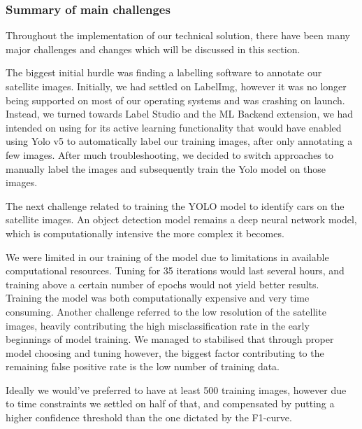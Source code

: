 \subsubsection{Summary of main challenges}
Throughout the implementation of our technical solution, there have been many
major challenges and changes which will be discussed in this section.


The biggest initial hurdle was finding a labelling software to annotate our
satellite images. Initially, we had settled on LabelImg, however it was no
longer being supported on most of our operating systems and was crashing on
launch. Instead, we turned towards Label Studio and the ML Backend extension, we
had intended on using for its active learning functionality that would have
enabled using Yolo v5 to automatically label our training images, after only
annotating a few images. After much troubleshooting, we decided to switch
approaches to manually label the images and subsequently train the Yolo model on
those images.

The next challenge related to training the YOLO model to identify cars on the
satellite images. An object detection model remains a deep neural network model,
which is computationally intensive the more complex it becomes.

We were limited in our training of the model due to limitations in available
computational resources. Tuning for 35 iterations would last several hours, and
training above a certain number of epochs would not yield better results.
Training the model was both computationally expensive and very time consuming.
Another challenge referred to the low resolution of the satellite images,
heavily contributing the high misclassification rate in the early beginnings of
model training. We managed to stabilised that through proper model choosing and
tuning however, the biggest factor contributing to the remaining false positive
rate is the low number of training data.

Ideally we would've preferred to have at least 500 training images, however due
to time constraints we settled on half of that, and compensated by putting a
higher confidence threshold than the one dictated by the F1-curve.


